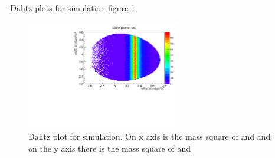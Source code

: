 - Dalitz plots for simulation figure \ref{fig:eventgeneration_dalitz}

\begin{figure}
	\centering
	\includegraphics[width=0.6\textwidth]{./plots/Dalitzplot_MC.pdf}
	\caption{Dalitz plot for simulation. On x axis is the mass square of \lam  and \kminus and on the y axis there is the mass square of \anticascade and \kminus}
	\label{fig:eventgeneration_dalitz}
\end{figure}

